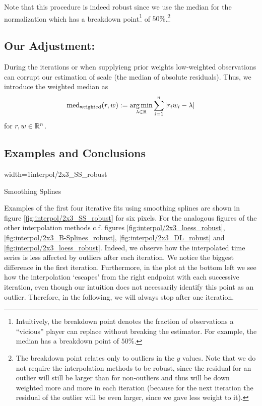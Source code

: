 {	Note that this procedure is indeed robust since we use the median for the normalization which has a breakdown point\footnote{Intuitively, the breakdown point denotes the fraction of observations a ``vicious'' player can replace without breaking the estimator. For example, the median has a breakdown point of $50 \%$.} of $50 \%$.\footnote{The breakdown point relates only to outliers in the $y$ values. Note that we do not require the interpolation methods to be robust, since the residual for an outlier will  still be larger than for non-outliers and thus will be down weighted more and more in each iteration (because for the next iteration the residual of the outlier will be even larger, since we gave less weight to it).}
	\subsection{Our Adjustment:}{
		During the iterations or when supplyieng prior weights low-weighted observations can corrupt our estimation of scale (the median of absolute residuals). Thus, we introduce the weighted median as
		$$
			\operatorname{med}_\text{weighted}(r,w) := \operatorname*{arg\, min}_{\lambda \in \mathbb{R}} \sum_{i=1}^n |r_iw_i -\lambda|
		$$
		for $r,w\in \mathbb{R}^n$. 
	}
	\subsection{Examples and Conclusions}{
		\begin{my_figure}[h]{width=1\textwidth}{interpol/2x3_SS_robust}
			\caption{Smoothing Splines \RobItPlot}
			\label{fig:interpol/2x3_SS_robust}
		\end{my_figure}

		Examples of the first four iterative fits using smoothing splines are shown in figure \ref{fig:interpol/2x3_SS_robust} for six pixels. For the analogous figures of the other interpolation methods c.f. figures \ref{fig:interpol/2x3_loess_robust}, \ref{fig:interpol/2x3_B-Splines_robust}, \ref{fig:interpol/2x3_DL_robust} and \ref{fig:interpol/2x3_loess_robust}.
		Indeed, we observe how the interpolated time series is less affected by outliers after each iteration. We notice the biggest difference in the first iteration. Furthermore, in the plot at the bottom left we see how the interpolation `escapes' from the right endpoint with each successive iteration, even though our intuition does not necessarily identify this point as an outlier. Therefore, in the following, we will always stop after one iteration.
	} 
	
}
